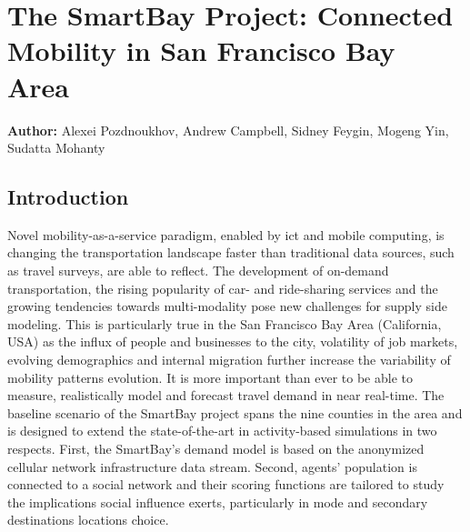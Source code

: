 \chapter{The SmartBay Project: Connected Mobility in San Francisco Bay Area}
\label{ch:sanfrancisco}
\hfill \textbf{Author:} Alexei Pozdnoukhov, Andrew Campbell, Sidney Feygin, Mogeng Yin, Sudatta Mohanty


\section{Introduction}
Novel mobility-as-a-service paradigm, enabled by \gls{ict} and mobile computing, is changing the transportation landscape faster than traditional data sources, such as travel surveys, are able to reflect. The development of on-demand transportation, the rising popularity of car- and ride-sharing services and the growing tendencies towards multi-modality pose new challenges for supply side modeling. This is particularly true in the San Francisco Bay Area (California, USA) as the influx of people and businesses to the city, volatility of job markets, evolving demographics and internal migration further increase the variability of mobility patterns evolution. It is more important than ever to be able to measure, realistically model and forecast travel demand in near real-time. The baseline scenario of the SmartBay project spans the nine counties in the area and is designed to extend the state-of-the-art in activity-based simulations in two respects. First, the SmartBay's demand model is based on the anonymized cellular network infrastructure data stream. Second, agents' population is connected to a social network and their scoring functions are tailored to study the implications social influence exerts, particularly in mode and secondary destinations locations choice. 

